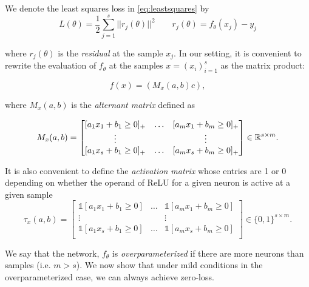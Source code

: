 We denote the least squares loss in \eqref{eq:leastsquares} by
\begin{equation}\label{eq:nnloss}
    L(\theta) = \frac{1}{2}\sum_{j=1}^s ||r_j(\theta)||^2 \qquad r_j(\theta) = f_\theta(x_j) - y_j
\end{equation}

where $r_j(\theta)$ is the \emph{residual} at the sample $x_j$. In our setting, it is convenient to rewrite the evaluation of $f_\theta$ at the samples $x = (x_i)_{i=1}^s$ as the matrix product:

\begin{equation}
    f(x) = (M_x(a, b) c),
\end{equation}

where $M_x(a, b)$ is the \emph{alternant matrix} defined as

\begin{equation}\label{eq:alternant_matrix}
\begin{aligned}
M_x(a, b) = 
\begin{bmatrix} 
    [a_1 x_1 + b_1\ge 0]_+ & \ldots & [a_m x_1 + b_m\ge 0]_+\\
    \vdots                 &        & \vdots\\
    [a_1 x_s + b_1\ge 0]_+ & \ldots & [a_m x_s + b_m\ge 0]_+\\
\end{bmatrix} \in \mathbb{R}^{s \times m}.
\end{aligned}
\end{equation}

It is also convenient to define the \emph{activation matrix} whose entries are 1 or 0 depending on whether the operand of ReLU for a given neuron is active at a given sample
\begin{equation}\label{eq:activation_matrix}
\tau_x(a, b) = 
\begin{bmatrix} 
\mathds{1}[a_1 x_1 + b_1\ge 0] & \ldots & \mathds 1[a_m x_1 + b_m\ge 0]\\
\vdots                         &        & \vdots\\
\mathds{1}[a_1 x_s + b_1\ge 0] & \ldots & \mathds 1[a_m x_s + b_m\ge 0]\\
\end{bmatrix} \in \{0,1\}^{s \times m}.
\end{equation}

We say that the network, $f_\theta$ is \emph{overparameterized} if there are more neurons than samples (i.e. $m > s$). We now show that under mild conditions in the overparameterized case, we can always achieve zero-loss.

